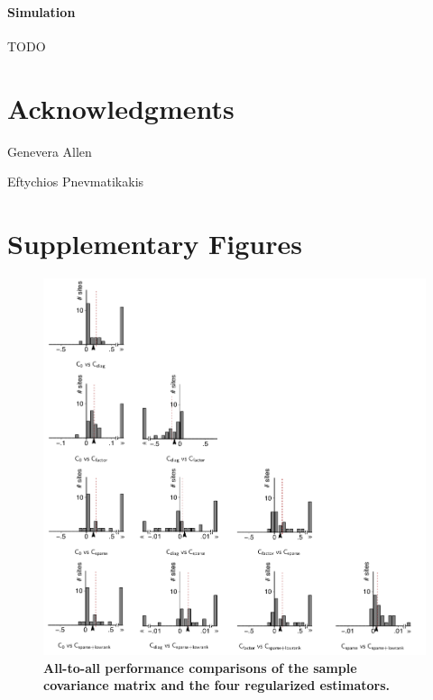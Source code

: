 \documentclass[10pt]{article}
\begin{document}
\paragraph{Simulation}
TODO

\section*{Acknowledgments}
Genevera Allen

Eftychios Pnevmatikakis 




\newpage
\section*{Supplementary Figures}

\setcounter{figure}{0}

\begin{figure}[!ht]
    \begin{center}
        \includegraphics{./figures/Figure-Supp01.pdf}
    \end{center}
    \caption{{\bf All-to-all performance comparisons of the sample covariance matrix and the four regularized estimators.}
}
\label{supp:01}
\end{figure}
\end{document}
